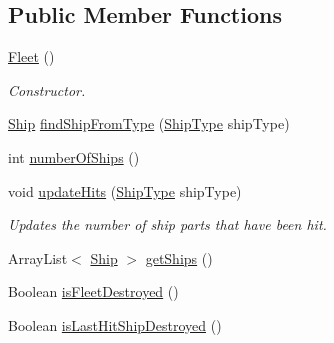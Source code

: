 \subsection*{Public Member Functions}
\begin{DoxyCompactItemize}
\item 
\hyperlink{classbattleship2D_1_1model_1_1Fleet_a9a46df779cb57eb0b1808a573ac4092b}{Fleet} ()
\begin{DoxyCompactList}\small\item\em Constructor. \end{DoxyCompactList}\item 
\hyperlink{classbattleship2D_1_1model_1_1Ship}{Ship} \hyperlink{classbattleship2D_1_1model_1_1Fleet_a7625af5c1f9ff69cdf36435071f68067}{find\-Ship\-From\-Type} (\hyperlink{enumbattleship2D_1_1model_1_1ShipType}{Ship\-Type} ship\-Type)
\item 
int \hyperlink{classbattleship2D_1_1model_1_1Fleet_a5a1b1a93de04523fbd611e8ab6409563}{number\-Of\-Ships} ()
\item 
void \hyperlink{classbattleship2D_1_1model_1_1Fleet_a0a3dc6a4439ff0cfee866ddea9f95dd6}{update\-Hits} (\hyperlink{enumbattleship2D_1_1model_1_1ShipType}{Ship\-Type} ship\-Type)
\begin{DoxyCompactList}\small\item\em Updates the number of ship parts that have been hit. \end{DoxyCompactList}\item 
Array\-List$<$ \hyperlink{classbattleship2D_1_1model_1_1Ship}{Ship} $>$ \hyperlink{classbattleship2D_1_1model_1_1Fleet_aba27f200100513da49d732f3f3f1a523}{get\-Ships} ()
\item 
Boolean \hyperlink{classbattleship2D_1_1model_1_1Fleet_ae00eeb3cee781f1a21886d8a51ee6ec6}{is\-Fleet\-Destroyed} ()
\item 
Boolean \hyperlink{classbattleship2D_1_1model_1_1Fleet_a441dbb2a73b4828fe232e800decbf93a}{is\-Last\-Hit\-Ship\-Destroyed} ()
\end{DoxyCompactItemize}
